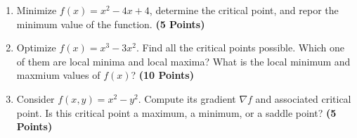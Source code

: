 \documentclass[12pt, xcolor=dvipsnames,svgnames,x11names]{article}
\begin{document}
\begin{enumerate}
\item Minimize $f(x) = x^2 - 4x + 4$, determine the critical point, and repor the minimum value of the function. \hfill \textbf{(5 Points)}

\item Optimize $f(x) = x^3 - 3x^2$. Find all the critical points possible. Which one of them are local minima and local maxima? What is the local minimum and maxmium values of $f(x)$? \hfill \textbf{(10 Points)}


\item Consider $f(x, y) = x^2 - y^2$. Compute its gradient $\nabla f$ and associated critical point. Is this critical point a maximum, a minimum, or a saddle point? \hfill \textbf{(5 Points)}

\end{enumerate}
\end{document}
